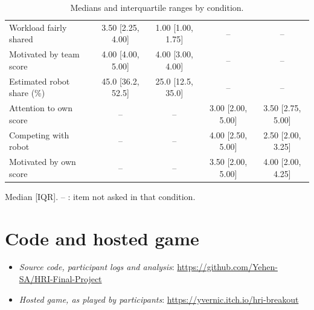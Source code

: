 \begin{table}[H]
\begin{tabular}{lcccc}
Workload fairly shared & 3.50 [2.25, 4.00] & 1.00 [1.00, 1.75] & -- & -- \\
Motivated by team score & 4.00 [4.00, 5.00] & 4.00 [3.00, 4.00] & -- & -- \\
Estimated robot share (\%) & 45.0 [36.2, 52.5] & 25.0 [12.5, 35.0] & -- & -- \\
Attention to own score & -- & -- & 3.00 [2.00, 5.00] & 3.50 [2.75, 5.00] \\
Competing with robot & -- & -- & 4.00 [2.50, 5.00] & 2.50 [2.00, 3.25] \\
Motivated by own score & -- & -- & 3.50 [2.00, 5.00] & 4.00 [2.00, 4.25] \\
\bottomrule
\end{tabular}
\par\smallskip\raggedright\scriptsize Median [IQR]. -- : item not asked in that condition.
\caption{Medians and interquartile ranges by condition.}
\label{tab:medians}
\end{table}

\clearpage
\section{Code and hosted game}
\label{app:links}
\begin{itemize}[nosep]
    \item \textit{Source code, participant logs and analysis}: \url{https://github.com/Yehen-SA/HRI-Final-Project}
    \item \textit{Hosted game, as played by participants}: \url{https://yvernic.itch.io/hri-breakout}
\end{itemize}
